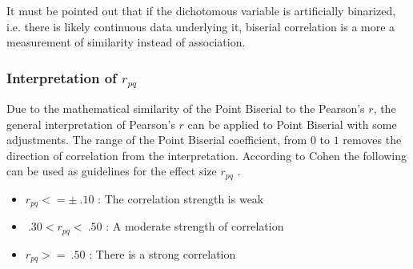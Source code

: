 \documentclass[a4paper,headsepline,footsepline,fontsize=11pt,BCOR=12mm,DIV=12]{report}
\begin{document}
\smallskip

It must be pointed out that if the dichotomous variable is artificially binarized, i.e. there is likely continuous data underlying it, biserial correlation is a more a measurement of similarity instead of association.

%
%

\subsubsection{Interpretation of $r_{pq}$}
Due to the mathematical similarity of the Point Biserial to the Pearson's $r$, the general interpretation of Pearson's $r$ can be applied to Point Biserial with some adjustments. The range of the Point Biserial coefficient, from $0$ to $1$ removes the direction of correlation from the interpretation. According to Cohen \cite{Cohen1988} the following can be used as guidelines for the effect size $r_{pq}$ \cite{Leblanc2017}.

\begin{itemize}
	\item $r_{pq} <= \pm \: .10$ : The correlation strength is weak
	\item $\: .30 < r_{pq} < \: .50$ : A moderate strength of correlation
	\item $r_{pq} >= \: .50$ : There is a strong correlation
\end{itemize}
\end{document}
